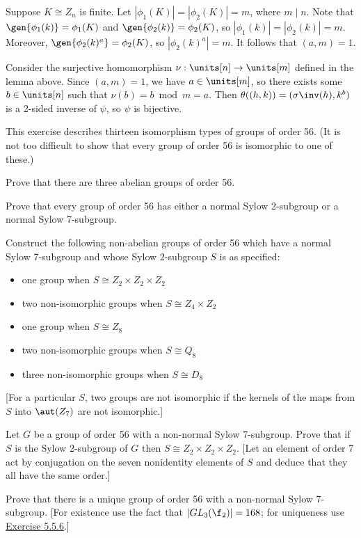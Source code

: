 \begin{sol}
\begin{enumerate}
        Suppose $K \cong Z_n$ is finite. Let $|\phi_1(K)| = |\phi_2(K)| = m$, where $m \mid n$. Note that $\gen{\phi_1(k)} = \phi_1(K)$ and $\gen{\phi_2(k)} = \phi_2(K)$, so $|\phi_1(k)| = |\phi_2(k)| = m$. Moreover, $\gen{\phi_2(k)^a} = \phi_2(K)$, so $|\phi_2(k)^a| = m$. It follows that $(a, m) = 1$. 
        
        Consider the surjective homomorphism $\nu : \units[n] \to \units[m]$ defined in the lemma above. Since $(a, m) = 1$, we have $a \in \units[m]$, so there exists some $b \in \units[n]$ such that $\nu(b) = b \bmod m = a$. Then $\theta((h, k)) = (\sigma\inv(h), k^b)$ is a 2-sided inverse of $\psi$, so $\psi$ is bijective. \qh
    \end{enumerate}
\end{sol}

\begin{specialexercise}\label{ex5.5.7}
    This exercise describes thirteen isomorphism types of groups of order 56. (It is not too difficult to show that every group of order 56 is isomorphic to one of these.)
    \begin{subproblems}
        \item Prove that there are three abelian groups of order 56.
        \item Prove that every group of order 56 has either a normal Sylow 2-subgroup or a normal Sylow 7-subgroup.
        \item Construct the following non-abelian groups of order 56 which have a normal Sylow 7-subgroup and whose Sylow 2-subgroup $S$ is as specified:
        \begin{itemize}
            \item one group when $S \cong Z_2 \times Z_2 \times Z_2$
            \item two non-isomorphic groups when $S \cong Z_4 \times Z_2$
            \item one group when $S \cong Z_8$
            \item two non-isomorphic groups when $S \cong Q_8$
            \item three non-isomorphic groups when $S \cong D_8$
        \end{itemize}
        [For a particular $S$, two groups are not isomorphic if the kernels of the maps from $S$ into $\aut(Z_7)$ are not isomorphic.]
        \item Let $G$ be a group of order 56 with a non-normal Sylow 7-subgroup. Prove that if $S$ is the Sylow 2-subgroup of $G$ then $S \cong Z_2 \times Z_2 \times Z_2$. [Let an element of order 7 act by conjugation on the seven nonidentity elements of $S$ and deduce that they all have the same order.]
        \item Prove that there is a unique group of order 56 with a non-normal Sylow 7-subgroup. [For existence use the fact that $|GL_3(\f_2)| = 168$; for uniqueness use \hyperref[ex5.5.6]{Exercise 5.5.6}.]
    \end{subproblems}
\end{specialexercise}

